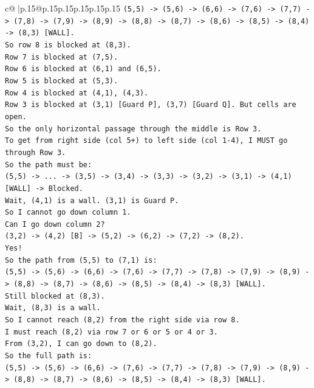 \documentclass{article}
\begin{document}
{\begin{supertabular}{c@{$\;$}|p{.15\linewidth}@{}p{.15\linewidth}p{.15\linewidth}p{.15\linewidth}p{.15\linewidth}p{.15\linewidth}}
{{{\texttt{(5,5) {-}> (5,6) {-}> (6,6) {-}> (7,6) {-}> (7,7) {-}> (7,8) {-}> (7,9) {-}> (8,9) {-}> (8,8) {-}> (8,7) {-}> (8,6) {-}> (8,5) {-}> (8,4) {-}> (8,3) {[}WALL{]}.} \\
\texttt{So row 8 is blocked at (8,3).} \\
\texttt{Row 7 is blocked at (7,5).} \\
\texttt{Row 6 is blocked at (6,1) and (6,5).} \\
\texttt{Row 5 is blocked at (5,3).} \\
\texttt{Row 4 is blocked at (4,1), (4,3).} \\
\texttt{Row 3 is blocked at (3,1) {[}Guard P{]}, (3,7) {[}Guard Q{]}. But cells are open.} \\
\texttt{So the only horizontal passage through the middle is Row 3.} \\
\texttt{To get from right side (col 5+) to left side (col 1{-}4), I MUST go through Row 3.} \\
\texttt{So the path must be:} \\
\texttt{(5,5) {-}> ... {-}> (3,5) {-}> (3,4) {-}> (3,3) {-}> (3,2) {-}> (3,1) {-}> (4,1) {[}WALL{]} {-}> Blocked.} \\
\texttt{Wait, (4,1) is a wall. (3,1) is Guard P.} \\
\texttt{So I cannot go down column 1.} \\
\texttt{Can I go down column 2?} \\
\texttt{(3,2) {-}> (4,2) {[}B{]} {-}> (5,2) {-}> (6,2) {-}> (7,2) {-}> (8,2).} \\
\texttt{Yes!} \\
\texttt{So the path from (5,5) to (7,1) is:} \\
\texttt{(5,5) {-}> (5,6) {-}> (6,6) {-}> (7,6) {-}> (7,7) {-}> (7,8) {-}> (7,9) {-}> (8,9) {-}> (8,8) {-}> (8,7) {-}> (8,6) {-}> (8,5) {-}> (8,4) {-}> (8,3) {[}WALL{]}.} \\
\texttt{Still blocked at (8,3).} \\
\texttt{Wait, (8,3) is a wall.} \\
\texttt{So I cannot reach (8,2) from the right side via row 8.} \\
\texttt{I must reach (8,2) via row 7 or 6 or 5 or 4 or 3.} \\
\texttt{From (3,2), I can go down to (8,2).} \\
\texttt{So the full path is:} \\
\texttt{(5,5) {-}> (5,6) {-}> (6,6) {-}> (7,6) {-}> (7,7) {-}> (7,8) {-}> (7,9) {-}> (8,9) {-}> (8,8) {-}> (8,7) {-}> (8,6) {-}> (8,5) {-}> (8,4) {-}> (8,3) {[}WALL{]}.} \\
}}}
\end{supertabular}}
\end{document}
